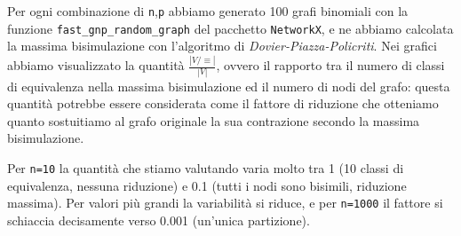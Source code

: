 Per ogni combinazione di \verb|n|,\verb|p| abbiamo generato 100 grafi binomiali con la funzione \verb|fast_gnp_random_graph| del pacchetto \texttt{NetworkX}, e ne abbiamo calcolata la massima bisimulazione con l'algoritmo di \emph{Dovier-Piazza-Policriti}. Nei grafici abbiamo visualizzato la quantità $\frac{|V / \equiv|}{|V|}$, ovvero il rapporto tra il numero di classi di equivalenza nella massima bisimulazione ed il numero di nodi del grafo: questa quantità potrebbe essere considerata come il fattore di riduzione che otteniamo quanto sostuitiamo al grafo originale la sua contrazione secondo la massima bisimulazione.

Per \verb|n=10| la quantità che stiamo valutando varia molto tra 1 (10 classi di equivalenza, nessuna riduzione) e 0.1 (tutti i nodi sono bisimili, riduzione massima). Per valori più grandi la variabilità si riduce, e per \verb|n=1000| il fattore si schiaccia decisamente verso 0.001 (un'unica partizione).
